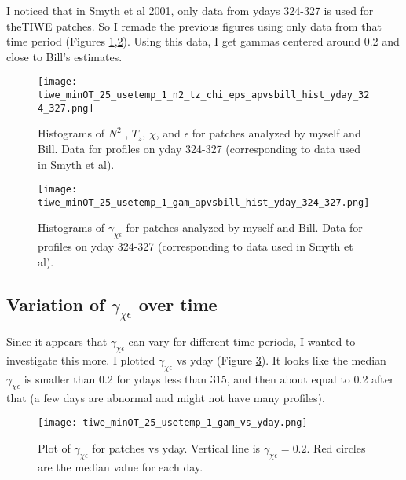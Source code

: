 \documentclass[11pt]{article}
\begin{document}
I noticed that in Smyth et al 2001, only data from ydays 324-327 is used for theTIWE patches. So I remade the previous figures using only data from that time period (Figures \ref{comp_bill_ap_324_327},\ref{comp_bill_ap_gam_324_327}). Using this data, I get  gammas centered around 0.2 and close to Bill's estimates. 

\begin{figure}[htbp]
\texttt{[image: tiwe\_minOT\_25\_usetemp\_1\_n2\_tz\_chi\_eps\_apvsbill\_hist\_yday\_324\_327.png]}
\caption{Histograms of $N^2$ , $T_z$, $\chi$, and $\epsilon$ for patches analyzed by myself and Bill. Data for profiles on yday 324-327 (corresponding to data used in Smyth et al).}
\label{comp_bill_ap_324_327}
\end{figure}


\begin{figure}[htbp]
\texttt{[image: tiwe\_minOT\_25\_usetemp\_1\_gam\_apvsbill\_hist\_yday\_324\_327.png]}
\caption{Histograms of $\gamma_{\chi\epsilon}$ for patches analyzed by myself and Bill. Data for profiles on yday 324-327 (corresponding to data used in Smyth et al).}
\label{comp_bill_ap_gam_324_327}
\end{figure}



\clearpage
\subsection{Variation of $\gamma_{\chi\epsilon}$ over time}

Since it appears that $\gamma_{\chi\epsilon}$ can vary for different time periods, I wanted to investigate this more. I plotted $\gamma_{\chi\epsilon}$ vs yday (Figure \ref{gamvsyday}). It looks like the median $\gamma_{\chi\epsilon}$ is smaller than 0.2 for ydays less than 315, and then about equal to 0.2 after that (a few days are abnormal and might not have many profiles).

\begin{figure}[htbp]
\texttt{[image: tiwe\_minOT\_25\_usetemp\_1\_gam\_vs\_yday.png]}
\caption{Plot of $\gamma_{\chi\epsilon}$ for patches vs yday. Vertical line is $\gamma_{\chi\epsilon}=0.2$. Red circles are the median value for each day.}
\label{gamvsyday}
\end{figure}
\end{document}
